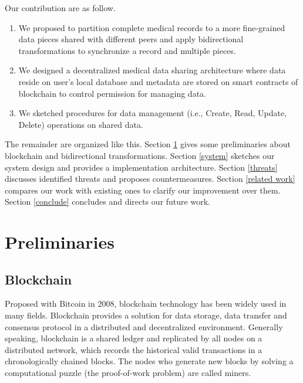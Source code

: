 \documentclass[conference]{IEEEtran}
\begin{document}
Our contribution are as follow.
\begin{enumerate}

	\item We proposed to partition complete medical records to a more fine-grained data pieces shared with different peers and apply bidirectional transformations to synchronize a record and multiple pieces.
	
	\item We designed  a decentralized medical data sharing architecture where data reside on user's local database and metadata are stored on smart contracts of blockchain to control permission for managing data.
		
	\item We sketched procedures for data management (i.e., Create, Read, Update, Delete) operations on shared data.
	

\end{enumerate}

The remainder are organized like this. Section \ref{preli} gives some preliminaries about blockchain and bidirectional transformations. Section \ref{system} sketches our system design and provides a implementation architecture. Section \ref{threats} discusses identified threats and proposes countermeasures. Section \ref{related work} compares our work with existing ones to clarify our improvement over them. Section \ref{conclude} concludes and directs our future work.

\section{Preliminaries}
\label{preli}

	\subsection{Blockchain}
	Proposed with Bitcoin \cite{nakamoto2008bitcoin} in 2008, blockchain technology has been widely used in many fields. Blockchain provides a solution for data storage, data transfer and consensus protocol in a distributed and decentralized environment. Generally speaking, blockchain is a shared ledger and replicated by all nodes on a distributed network, which records the historical valid transactions in a chronologically chained blocks. The nodes who generate new blocks by solving a computational puzzle (the proof-of-work problem) are called miners.
	
\end{document}
